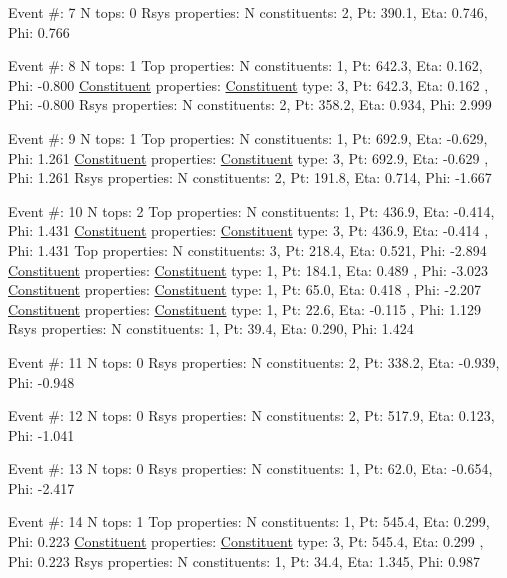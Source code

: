 \begin{DoxyCode}
Event #: 7
      N tops: 0
      Rsys properties: N constituents:   2,   Pt:  390.1,   Eta:   0.746,   Phi:   0.766

Event #: 8
      N tops: 1
      Top properties: N constituents:   1,   Pt:  642.3,   Eta:   0.162,   Phi:  -0.800
          \hyperlink{classConstituent}{Constituent} properties: \hyperlink{classConstituent}{Constituent} type:   3,   Pt:  642.3,   Eta:   0.162
      ,   Phi:  -0.800
      Rsys properties: N constituents:   2,   Pt:  358.2,   Eta:   0.934,   Phi:   2.999

Event #: 9
      N tops: 1
      Top properties: N constituents:   1,   Pt:  692.9,   Eta:  -0.629,   Phi:   1.261
          \hyperlink{classConstituent}{Constituent} properties: \hyperlink{classConstituent}{Constituent} type:   3,   Pt:  692.9,   Eta:  -0.629
      ,   Phi:   1.261
      Rsys properties: N constituents:   2,   Pt:  191.8,   Eta:   0.714,   Phi:  -1.667

Event #: 10
      N tops: 2
      Top properties: N constituents:   1,   Pt:  436.9,   Eta:  -0.414,   Phi:   1.431
          \hyperlink{classConstituent}{Constituent} properties: \hyperlink{classConstituent}{Constituent} type:   3,   Pt:  436.9,   Eta:  -0.414
      ,   Phi:   1.431
      Top properties: N constituents:   3,   Pt:  218.4,   Eta:   0.521,   Phi:  -2.894
          \hyperlink{classConstituent}{Constituent} properties: \hyperlink{classConstituent}{Constituent} type:   1,   Pt:  184.1,   Eta:   0.489
      ,   Phi:  -3.023
          \hyperlink{classConstituent}{Constituent} properties: \hyperlink{classConstituent}{Constituent} type:   1,   Pt:   65.0,   Eta:   0.418
      ,   Phi:  -2.207
          \hyperlink{classConstituent}{Constituent} properties: \hyperlink{classConstituent}{Constituent} type:   1,   Pt:   22.6,   Eta:  -0.115
      ,   Phi:   1.129
      Rsys properties: N constituents:   1,   Pt:   39.4,   Eta:   0.290,   Phi:   1.424

Event #: 11
      N tops: 0
      Rsys properties: N constituents:   2,   Pt:  338.2,   Eta:  -0.939,   Phi:  -0.948

Event #: 12
      N tops: 0
      Rsys properties: N constituents:   2,   Pt:  517.9,   Eta:   0.123,   Phi:  -1.041

Event #: 13
      N tops: 0
      Rsys properties: N constituents:   1,   Pt:   62.0,   Eta:  -0.654,   Phi:  -2.417

Event #: 14
      N tops: 1
      Top properties: N constituents:   1,   Pt:  545.4,   Eta:   0.299,   Phi:   0.223
          \hyperlink{classConstituent}{Constituent} properties: \hyperlink{classConstituent}{Constituent} type:   3,   Pt:  545.4,   Eta:   0.299
      ,   Phi:   0.223
      Rsys properties: N constituents:   1,   Pt:   34.4,   Eta:   1.345,   Phi:   0.987


\end{DoxyCode}
